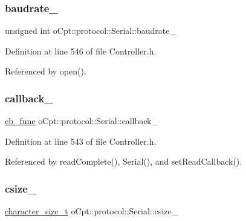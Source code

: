 \subsubsection{\texorpdfstring{baudrate\+\_\+}{baudrate\_}}
{\footnotesize\ttfamily unsigned int o\+Cpt\+::protocol\+::\+Serial\+::baudrate\+\_\+\hspace{0.3cm}{\ttfamily [protected]}}



Definition at line 546 of file Controller.\+h.



Referenced by open().

\hypertarget{classo_cpt_1_1protocol_1_1_serial_a653c57dab573b8f0d6d06e0f1443d045}{}\label{classo_cpt_1_1protocol_1_1_serial_a653c57dab573b8f0d6d06e0f1443d045} 
\subsubsection{\texorpdfstring{callback\+\_\+}{callback\_}}
{\footnotesize\ttfamily \hyperlink{classo_cpt_1_1protocol_1_1_serial_ad55591180be8bea2fe3832b1265b7496}{cb\+\_\+func} o\+Cpt\+::protocol\+::\+Serial\+::callback\+\_\+\hspace{0.3cm}{\ttfamily [protected]}}



Definition at line 543 of file Controller.\+h.



Referenced by read\+Complete(), Serial(), and set\+Read\+Callback().

\hypertarget{classo_cpt_1_1protocol_1_1_serial_ab64a625816c6697c301c5d6c79612044}{}\label{classo_cpt_1_1protocol_1_1_serial_ab64a625816c6697c301c5d6c79612044} 
\subsubsection{\texorpdfstring{csize\+\_\+}{csize\_}}
{\footnotesize\ttfamily \hyperlink{classo_cpt_1_1protocol_1_1_serial_a8799e83d5d812132c296dd4a6a17d6f6}{character\+\_\+size\+\_\+t} o\+Cpt\+::protocol\+::\+Serial\+::csize\+\_\+\hspace{0.3cm}{\ttfamily [protected]}}



